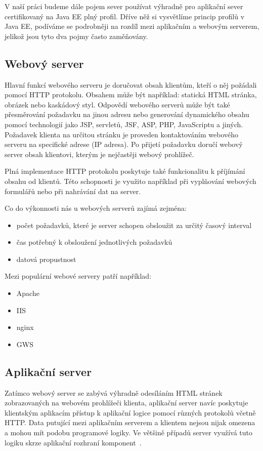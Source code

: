 \documentclass[122pt,oneside]{fithesis}
\begin{document}
V naší práci budeme dále pojem sever používat výhradně pro aplikační sever certifikovaný na Java EE plný profil. Dříve něž si vysvětlíme princip profilů v Java EE, podíváme se podrobněji na rozdíl mezi aplikačním a webovým serverem, jelikož jsou tyto dva pojmy často zaměňovány.

\subsection{Webový server}
Hlavní funkcí webového serveru je doručovat obsah klientům, kteří o něj požádali pomocí HTTP protokolu. Obsahem může být například: statická HTML stránka, obrázek nebo kaskádový styl. Odpovědí webového serverů může být také přesměrování požadavku na jinou adresu nebo generování dynamického obsahu pomocí technologií jako JSP, servletů, JSF, ASP, PHP, JavaScriptu a jiných. Požadavek klienta na určitou stránku je proveden kontaktováním webového serveru na specifické adrese (IP adresa). Po přijetí požadavku doručí webový server obsah klientovi, kterým je nejčastěji webový prohlížeč.

Plná implementace HTTP protokolu poskytuje také funkcionalitu k příjímání obsahu od klientů. Této schopnosti je využito například při vyplňování webových formulářů nebo při nahrávání dat na server.

Co do výkonnosti nás u webových serverů zajímá zejména:
\begin{itemize}
  \item počet požadavků, které je server schopen obsloužit za určitý časový interval
  \item čas potřebný k obsloužení jednotlivých požadavků
  \item datová propustnost
\end{itemize}
Mezi populární webové servery patří například:
\begin{itemize}
  \item Apache
  \item IIS
  \item nginx
  \item GWS
\end{itemize}

\subsection{Aplikační server}
Zatímco webový server se zabývá výhradně odesíláním HTML stránek zobrazovaných na webovém prohlížeči klienta, aplikační server navíc poskytuje klientským aplikacím přístup k aplikační logice pomocí různých protokolů včetně HTTP. Data putující mezi aplikačním serverem a klientem nejsou nijak omezena a mohou mít podobu programové logiky. Ve většině případů server využívá tuto logiku skrze aplikační rozhraní komponent~\cite{sintes02}.
\end{document}
